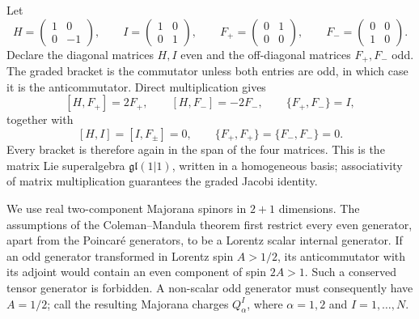 \ExerciseEditorialNote

\begin{enumerate}
  Let
  \[
    H=\begin{pmatrix}1&0\\0&-1\end{pmatrix},
    \qquad
    I=\begin{pmatrix}1&0\\0&1\end{pmatrix},
    \qquad
    F_+=\begin{pmatrix}0&1\\0&0\end{pmatrix},
    \qquad
    F_-=\begin{pmatrix}0&0\\1&0\end{pmatrix}.
  \]
  Declare the diagonal matrices \(H,I\) even and the off-diagonal matrices
  \(F_+,F_-\) odd.  The graded bracket is the commutator unless both
  entries are odd, in which case it is the anticommutator.  Direct
  multiplication gives
  \[
    [H,F_+]=2F_+,\qquad [H,F_-]=-2F_-,
    \qquad \{F_+,F_-\}=I,
  \]
  together with
  \[
    [H,I]=[I,F_\pm]=0,\qquad
    \{F_+,F_+\}=\{F_-,F_-\}=0.
  \]
  Every bracket is therefore again in the span of the four matrices.  This
  is the matrix Lie superalgebra \(\mathfrak{gl}(1|1)\), written in a
  homogeneous basis; associativity of matrix multiplication guarantees the
  graded Jacobi identity.

  We use real two-component Majorana spinors in \(2+1\) dimensions.  The
  assumptions of the Coleman--Mandula theorem first restrict every even
  generator, apart from the Poincar\'e generators, to be a Lorentz scalar
  internal generator.  If an odd generator transformed in Lorentz spin
  \(A>1/2\), its anticommutator with its adjoint would contain an even
  component of spin \(2A>1\).  Such a conserved tensor generator is
  forbidden.  A non-scalar odd generator must consequently have \(A=1/2\);
  call the resulting Majorana charges \(Q^I_\alpha\), where
  \(\alpha=1,2\) and \(I=1,\ldots,N\).


\end{enumerate}
